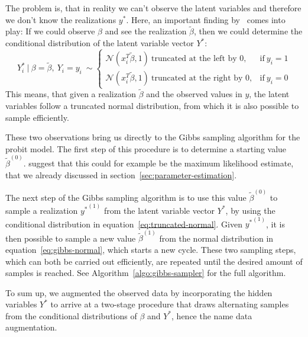 The problem is, that in reality we can't observe the latent variables and
therefore we don't know the realizations $y^\ast$.
Here, an important finding by~\cite{gibbs-probit-albert-chib} comes
into play: If we could observe $\beta$ and see the realization
$\tilde\beta$, then we could determine the conditional distribution
of the latent variable vector $Y^\ast$:
\begin{equation}
    \label{eq:truncated-normal}
    Y_i^\ast\ |\ \beta = \tilde\beta,\ Y_i=y_i\ \sim
    \begin{cases}
        \mathcal{N}(x_i^T\tilde\beta, 1)\ \text{truncated at the left by 0},  & \text{if}\ y_i = 1 \\
        \mathcal{N}(x_i^T\tilde\beta, 1)\ \text{truncated at the right by 0}, & \text{if}\ y_i = 0
    \end{cases}
\end{equation}
This means, that given a realization $\tilde\beta$ and the observed
values in $y$, the latent variables
follow a truncated normal distribution, from which it is also
possible to sample efficiently.

These two observations bring us directly to the Gibbs sampling algorithm
for the probit model. The first step of this procedure is
to determine a starting value $\tilde\beta^{(0)}$.
\cite{gibbs-probit-albert-chib} suggest that this could for example
be the maximum likelihood estimate, that we already discussed in
section~\ref{sec:parameter-estimation}.

The next step of the Gibbs sampling algorithm is to use this value
$\tilde\beta^{(0)}$ to sample a realization ${y^\ast}^{(1)}$ from the latent
variable vector $Y^\ast$, by using the conditional distribution
in equation~\ref{eq:truncated-normal}. Given ${y^\ast}^{(1)}$,
it is then possible to sample a new value $\tilde\beta^{(1)}$ from
the normal distribution in equation~\ref{eq:gibbs-normal},
which starts a new cycle. These two sampling steps, which can
both be carried out efficiently, are repeated until
the desired amount of samples is reached.
See Algorithm~\ref{algo:gibbs-sampler} for the full algorithm.

To sum up, we augmented the observed data by incorporating the
hidden variables $Y^\ast$ to arrive at a two-stage procedure
that draws alternating samples from the conditional distributions
of $\beta$ and $Y^\ast$, hence the name data augmentation.

